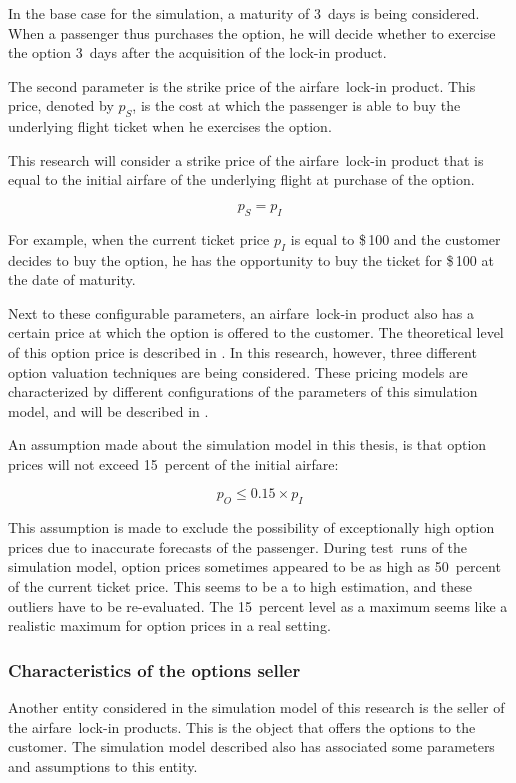 In the base case for the simulation, a maturity of 3~days is being considered. When a passenger thus purchases the option, he will decide whether to exercise the option 3~days after the acquisition of the lock-in product.

The second parameter is the strike price of the airfare~lock-in product. This price, denoted by $p_S$, is the cost at which the passenger is able to buy the underlying flight ticket when he exercises the option.

This research will consider a strike price of the airfare~lock-in product that is equal to the initial airfare of the underlying flight at purchase of the option.

$$p_S = p_I$$

For example, when the current ticket price $p_I$ is equal to \$\,100 and the customer decides to buy the option, he has the opportunity to buy the ticket for \$\,100 at the date of maturity.  

Next to these configurable parameters, an airfare~lock-in product also has a certain price at which the option is offered to the customer. The theoretical level of this option price is described in . In this research, however, three different option valuation techniques are being considered. These pricing models are characterized by different configurations of the parameters of this simulation model, and will be described in .

An assumption made about the simulation model in this thesis, is that option prices will not exceed 15~percent of the initial airfare:

$$p_O \le 0.15 \times p_I$$

This assumption is made to exclude the possibility of exceptionally high option prices due to inaccurate forecasts of the passenger. During test~runs of the simulation model, option prices sometimes appeared to be as high as 50~percent of the current ticket price. This seems to be a to high estimation, and these outliers have to be re-evaluated. The 15~percent level as a maximum seems like a realistic maximum for option prices in a real setting.


\subsubsection{Characteristics of the options seller}
Another entity considered in the simulation model of this research is the seller of the airfare~lock-in products. This is the object that offers the options to the customer. The simulation model described also has associated some parameters and assumptions to this entity.

